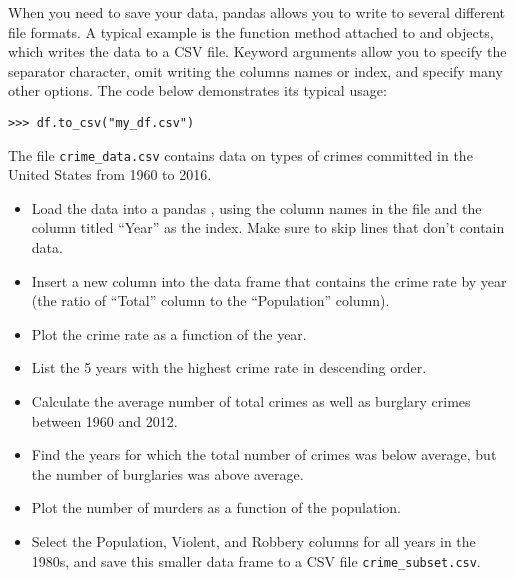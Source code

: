 When you need to save your data, pandas allows you to write to several different
file formats.
A typical example is the  function method attached to
 and  objects, which writes the data to a CSV file.
Keyword arguments allow you to specify the separator character, omit writing the
columns names or index, and specify many other options.
The code below
demonstrates its typical usage:
\begin{lstlisting}
>>> df.to_csv("my_df.csv")
\end{lstlisting}

\begin{problem} %
The file \texttt{crime\_data.csv} contains data on types of crimes committed in the United States from 1960 to 2016.
\begin{itemize}
\item Load the data into a pandas , using the column names in the file and the column titled
``Year'' as the index.
Make sure to skip lines that don't contain data.

\item Insert a new column into the data frame that contains the crime rate by year (the ratio of ``Total'' column
to the ``Population'' column).

\item Plot the crime rate as a function of the year.

\item List the 5 years with the highest crime rate in descending order.

\item Calculate the average number of total crimes as well as burglary crimes between 1960 and 2012.

\item Find the years for which the total number of crimes was below average, but the number of burglaries
was above average.

\item Plot the number of murders as a function of the population.

\item Select the Population, Violent, and Robbery columns for all years in the 1980s, and save
this smaller data frame to a CSV file \texttt{crime\_subset.csv}.
\end{itemize}
\end{problem}

